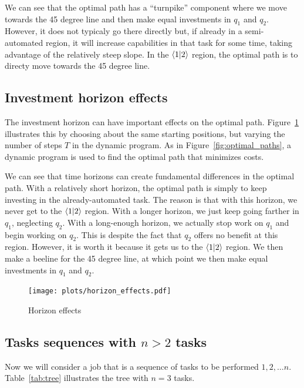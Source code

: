 \documentclass{article}
\theoremstyle{plain}
\theoremstyle{plain}
\begin{document}
We can see that the optimal path has a ``turnpike'' component where we move towards the 45 degree line and then make equal investments in $q_1$ and $q_2$.
However, it does not typicaly go there directly but, if already in a semi-automated region, it will increase capabilities in that task for some time, taking advantage of the relatively steep slope. 
In the $\langle 1|2 \rangle$ region, the optimal path is to directy move towards the 45 degree line.

\subsection{Investment horizon effects}
The investment horizon can have important effects on the optimal path.
Figure~\ref{fig:horizon_effects} illustrates this by choosing about the same starting positions, but varying the number of steps $T$ in the dynamic program.
As in Figure~\ref{fig:optimal_paths}, a dynamic program is used to find the optimal path that minimizes costs.

We can see that time horizons can create fundamental differences in the optimal path.
With a relatively short horizon, the optimal path is simply to keep investing in the already-automated task.
The reason is that with this horizon, we never get to the $\langle 1|2 \rangle$ region.
With a longer horizon, we just keep going farther in $q_1$, neglecting $q_2$.
With a long-enough horizon, we actually stop work on $q_1$ and begin working on $q_2$.
This is despite the fact that $q_2$ offers no benefit at this region.
However, it is worth it because it gets us to the $\langle 1|2 \rangle$ region.
We then make a beeline for the 45 degree line, at which point we then make equal investments in $q_1$ and $q_2$.

\begin{figure}
  \begin{center}
  \caption{Horizon effects} \label{fig:horizon_effects}
  \texttt{[image: plots/horizon\_effects.pdf]}
  \end{center}
\end{figure}

\subsection{Tasks sequences with $n > 2$ tasks}
Now we will consider a job that is a sequence of tasks to be performed $1, 2, \ldots n$.
Table~\ref{tab:tree} illustrates the tree with $n=3$ tasks.
\end{document}
